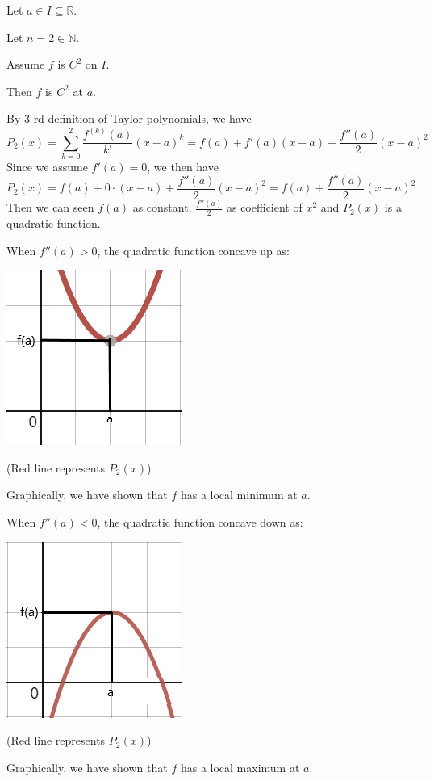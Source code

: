 \documentclass[12pt]{exam}
\newcommand{\R}{\mathbb{R}}
\newcommand{\N}{\mathbb{N}}
\begin{document}
\begin{enumerate}
\begin{enumerate}
			Let $a \in I\subseteq\R$.
			
			Let $n=2\in\N$.
			
			Assume $f$ is $C^2$ on $I$.
			
			Then $f$ is $C^2$ at $a$.
			
			By 3-rd definition of Taylor polynomials, we have
			$$
			    P_2(x)=\sum_{k=0}^2 \frac{f^{(k)}(a)}{k!}(x-a)^k=f(a)+f'(a)(x-a)+\frac{f''(a)}{2}(x-a)^2
			$$
			Since we assume $f'(a) = 0$, we then have
			$$
			    P_2(x)=f(a)+0\cdot(x-a)+\frac{f''(a)}{2}(x-a)^2=f(a)+\frac{f''(a)}{2}(x-a)^2
			$$
			Then we can seen $f(a)$ as constant, $\frac{f''(a)}{2}$ as coefficient of $x^2$ and $P_2(x)$ is a quadratic function.
			
			When $f''(a)>0$, the quadratic function concave up as:
			\begin{center}
			    \includegraphics[scale=0.75]{Upward}
			    
			    (Red line represents $P_2(x)$)
			\end{center}
			Graphically, we have shown that $f$ has a local minimum at $a$.
			
			\newpage
			
			When $f''(a)<0$, the quadratic function concave down as:
			\begin{center}
			    \includegraphics[scale=0.75]{Downward}
			    
			    (Red line represents $P_2(x)$)
			\end{center}
			Graphically, we have shown that $f$ has a local maximum at $a$.
			

\end{enumerate}
\end{enumerate}
\end{document}

